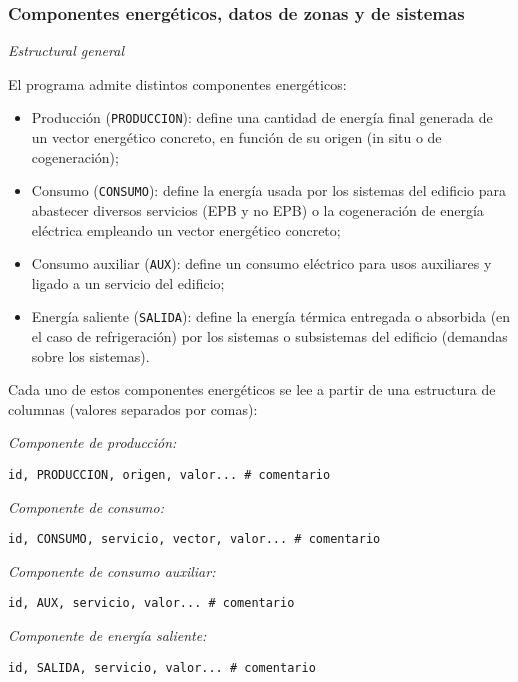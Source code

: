 \documentclass[10pt,notitlepage,oneside,a4paper]{article}
\begin{document}
\subsubsection{Componentes energéticos, datos de zonas y de sistemas}\label{sec:componentesenergeticos}

\textit{Estructural general}

El programa admite distintos componentes energéticos:

\begin{itemize}
    \item Producción (\texttt{PRODUCCION}): define una cantidad de energía final generada de un vector energético concreto, en función de su origen (in situ o de cogeneración);
    \item Consumo (\texttt{CONSUMO}): define la energía usada por los sistemas del edificio para abastecer diversos servicios (EPB y no EPB) o la cogeneración de energía eléctrica empleando un vector energético concreto;
    \item Consumo auxiliar (\texttt{AUX}): define un consumo eléctrico para usos auxiliares y ligado a un servicio del edificio;
    \item Energía saliente (\texttt{SALIDA}): define la energía térmica entregada o absorbida (en el caso de refrigeración) por los sistemas o subsistemas del edificio (demandas sobre los sistemas).
\end{itemize}

Cada uno de estos componentes energéticos se lee a partir de una estructura de columnas (valores separados por comas):

\textit{Componente de producción:}

\begin{lstlisting}
id, PRODUCCION, origen, valor... # comentario
\end{lstlisting}

\textit{Componente de consumo:}

\begin{lstlisting}
id, CONSUMO, servicio, vector, valor... # comentario
\end{lstlisting}

\textit{Componente de consumo auxiliar:}

\begin{lstlisting}
id, AUX, servicio, valor... # comentario
\end{lstlisting}

\textit{Componente de energía saliente:}

\begin{lstlisting}
id, SALIDA, servicio, valor... # comentario
\end{lstlisting}
\end{document}
